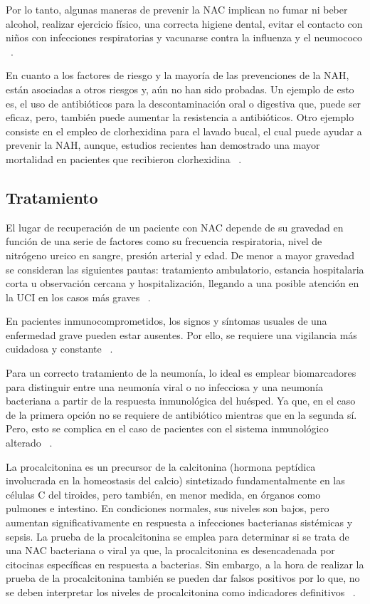 Por lo tanto, algunas maneras de prevenir la NAC implican no fumar ni beber alcohol, realizar ejercicio físico, una correcta higiene dental, evitar el contacto con niños con infecciones respiratorias y vacunarse contra la influenza y el neumococo ~\cite{lim2022pneumonia}.

En cuanto a los factores de riesgo y la mayoría de las prevenciones de la NAH, están asociadas a otros riesgos y, aún no han sido probadas. Un ejemplo de esto es, el uso de antibióticos para la descontaminación oral o digestiva que, puede ser eficaz, pero, también puede aumentar la resistencia a antibióticos. Otro ejemplo consiste en el empleo de clorhexidina para el lavado bucal, el cual puede ayudar a prevenir la NAH, aunque, estudios recientes han demostrado una mayor mortalidad en pacientes que recibieron clorhexidina ~\cite{antoni2021}.

\subsection{Tratamiento}

El lugar de recuperación de un paciente con NAC depende de su gravedad en función de una serie de factores como su frecuencia respiratoria, nivel de nitrógeno ureico en sangre, presión arterial y edad. De menor a mayor gravedad se consideran las siguientes pautas: tratamiento ambulatorio, estancia hospitalaria corta u observación cercana y hospitalización, llegando a una posible atención en la UCI en los casos más graves ~\cite{file2023community}. 

En pacientes inmunocomprometidos, los signos y síntomas usuales de una enfermedad grave pueden estar ausentes. Por ello, se requiere una vigilancia más cuidadosa y constante ~\cite{lim2022pneumonia}.

Para un correcto tratamiento de la neumonía, lo ideal es emplear biomarcadores para distinguir entre una neumonía viral o no infecciosa y una neumonía bacteriana a partir de la respuesta inmunológica del huésped. Ya que, en el caso de la primera opción no se requiere de antibiótico mientras que en la segunda sí. Pero, esto se complica en el caso de pacientes con el sistema inmunológico alterado ~\cite{lim2022pneumonia}. 

La procalcitonina es un precursor de la calcitonina (hormona peptídica involucrada en la homeostasis del calcio) sintetizado fundamentalmente en las células C del tiroides, pero también, en menor medida, en órganos como pulmones e intestino. En condiciones normales, sus niveles son bajos, pero aumentan significativamente en respuesta a infecciones bacterianas sistémicas y sepsis. La prueba de la procalcitonina se emplea para determinar si se trata de una NAC bacteriana o viral ya que, la procalcitonina es desencadenada por citocinas específicas en respuesta a bacterias. Sin embargo, a la hora de realizar la prueba de la procalcitonina también se pueden dar falsos positivos por lo que, no se deben interpretar los niveles de procalcitonina como indicadores definitivos ~\cite{file2023community}.

